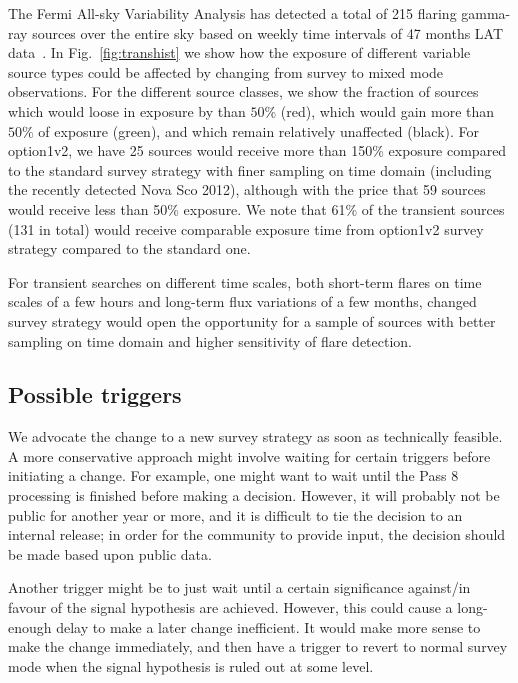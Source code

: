 \documentclass[aps,prd,superscriptaddress,nofootinbib,fixlfloat, 12pt]{revtex4-1}
\begin{document}
The Fermi All-sky Variability Analysis has detected a total
of 215 flaring gamma-ray sources over the entire sky based
on weekly time intervals of 47 months LAT
data~\cite{1FAV:2013}. In Fig.~\ref{fig:transhist} we show
how the exposure of different variable source types could be
affected by changing from survey to mixed mode
observations. For the different source classes, we show the
fraction of sources which would loose in exposure by than
$50\%$ (red), which would gain more than $50\%$ of exposure
(green), and which remain relatively unaffected (black). For
option1v2, we have 25 sources would receive more than 150\%
exposure compared to the standard survey strategy with finer
sampling on time domain (including the recently detected
Nova Sco 2012), although with the price that 59 sources
would receive less than 50\% exposure. We note that 61\% of
the transient sources (131 in total) would receive
comparable exposure time from option1v2 survey strategy
compared to the standard one.

For transient searches on different time scales, both
short-term flares on time scales of a few hours and
long-term flux variations of a few months, changed survey
strategy would open the opportunity for a sample of sources
with better sampling on time domain and higher sensitivity
of flare detection.


\subsection{Possible triggers}
We advocate the change to a new survey strategy as soon as technically
feasible. A more conservative approach might involve waiting for certain
triggers before initiating a change. For example, one might want to wait until
the Pass 8 processing is finished before making a decision.  However, it will
probably not be public for another year or more, and it is difficult to tie
the decision to an internal release; in order for the community to provide
input, the decision should be made based upon public data. 

Another trigger might be to just wait until a certain significance against/in
favour of the signal hypothesis are achieved. However, this could cause a
long-enough delay to make a later change inefficient. It would make more sense
to make the change immediately, and then have a trigger to revert to normal
survey mode when the signal hypothesis is ruled out at some level.

\end{document}
